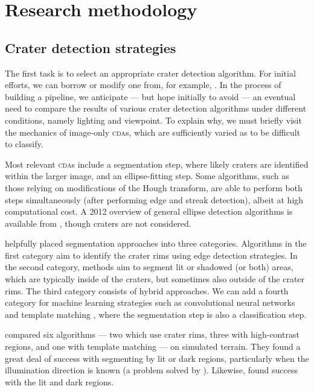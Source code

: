 \documentclass[12pt]{olfmemo}
\begin{document}
\section{Research methodology}
\subsection{Crater detection strategies}
The first task is to select an appropriate crater detection algorithm. For initial efforts, we can borrow or modify one from, for example, \citet{Woicke2018}. In the process of building a pipeline, we anticipate --- but hope initially to avoid --- an eventual need to compare the results of various crater detection algorithms under different conditions, namely lighting and viewpoint. To explain why, we must briefly visit the mechanics of image-only \textsc{cda}s, which are sufficiently varied as to be difficult to classify.

Most relevant \textsc{cda}s include a segmentation step, where likely craters are identified within the larger image, and an ellipse-fitting step. Some algorithms, such as those relying on modifications of the Hough transform, are able to perform both steps simultaneously (after performing edge and streak detection), albeit at high computational cost. A 2012 overview of general ellipse detection algorithms is available from \citet{Wong2012}, though craters are not considered.

\citet{Maass2016} helpfully placed segmentation approaches into three categories. Algorithms in the first category aim to identify the crater rims using edge detection strategies. In the second category, methods aim to segment lit or shadowed (or both) areas, which are typically inside of the craters, but sometimes also outside of the crater rims. The third category consists of hybrid approaches. We can add a fourth category for machine learning strategies such as convolutional neural networks \citep{DeLatte2019} and template matching \citep{Bandeira2007}, where the segmentation step is also a classification step. %

\citet{Woicke2018} compared six algorithms --- two which use crater rims, three with high-contrast regions, and one with template matching --- on simulated terrain. They found a great deal of success with segmenting by lit or dark regions, particularly when the illumination direction is known (a problem solved by \citet{Maass2016}). Likewise, \citet{Maass2020} found success with the lit and dark regions.
\end{document}
